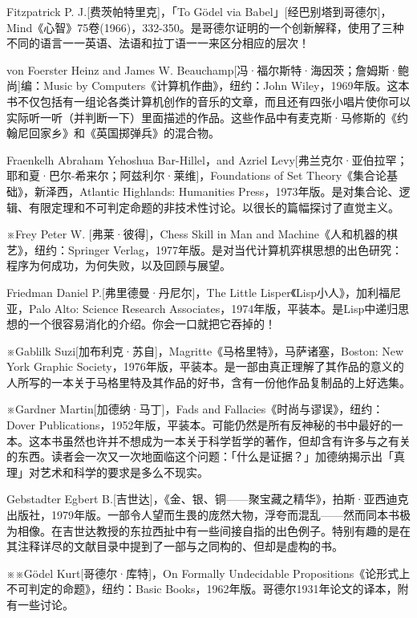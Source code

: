 \documentclass[
  12pt,
  twoside,
  openright,
  oldfontcommands,
]{memoir}
\begin{document}
Fitzpatrick P. J.{[}费茨帕特里克{]}，「To Gödel via
Babel」{[}经巴别塔到哥德尔{]}，Mind《心智》75卷(1966)，332-350。是哥德尔证明的一个创新解释，使用了三种不同的语言一一英语、法语和拉丁语一一来区分相应的层次！

von Foerster Heinz and James W.
Beauchamp{[}冯·福尔斯特·海因茨；詹姆斯·鲍尚{]}编：Music by
Computers《计算机作曲》，纽约：John
Wiley，1969年版。这本书不仅包括有一组论各类计算机创作的音乐的文章，而且还有四张小唱片使你可以实际听一听（并判断一下）里面描述的作品。这些作品中有麦克斯·马修斯的《约翰尼回家乡》和《英国掷弹兵》的混合物。

Fraenkelh Abraham Yehoshua Bar-Hillel，and Azriel
Levy{[}弗兰克尔·亚伯拉罕；耶和夏·巴尔-希来尔；阿兹利尔·莱维{]}，Foundations
of Set Theory《集合论基础》，新泽西，Atlantic Highlands: Humanities
Press，1973年版。是对集合论、逻辑、有限定理和不可判定命题的非技术性讨论。以很长的篇幅探讨了直觉主义。

※Frey Peter W. {[}弗莱·彼得{]}，Chess Skill in Man and
Machine《人和机器的棋艺》，纽约：Springer
Verlag，1977年版。是对当代计算机弈棋思想的出色研究：程序为何成功，为何失败，以及回顾与展望。

Friedman Daniel P.{[}弗里德曼·丹尼尔{]}，The Little
Lisper《Lisp小人》，加利福尼亚，Palo Alto: Science Research
Associates，1974年版，平装本。是Lisp中递归思想的一个很容易消化的介绍。你会一口就把它吞掉的！

※Gablilk
Suzi{[}加布利克·苏自{]}，Magritte《马格里特》，马萨诸塞，Boston: New
York Graphic
Society，1976年版，平装本。是一部由真正理解了其作品的意义的人所写的一本关于马格里特及其作品的好书，含有一份他作品复制品的上好选集。

※Gardner Martin{[}加德纳·马丁{]}，Fads and
Fallacies《时尚与谬误》，纽约：Dover
Publications，1952年版，平装本。可能仍然是所有反神秘的书中最好的一本。这本书虽然也许并不想成为一本关于科学哲学的著作，但却含有许多与之有关的东西。读者会一次又一次地面临这个问题：「什么是证据？」加德纳揭示出「真理」对艺术和科学的要求是多么不现实。

Gebstadter Egbert
B.{[}吉世达{]}，《金、银、铜------聚宝藏之精华》，拍斯·亚西迪克出版社，1979年版。一部令人望而生畏的庞然大物，浮夸而混乱------然而同本书极为相像。在吉世达教授的东拉西扯中有一些间接自指的出色例子。特别有趣的是在其注释详尽的文献目录中提到了一部与之同构的、但却是虚构的书。

※※Gödel Kurt{[}哥德尔·库特{]}，On Formally Undecidable
Propositions《论形式上不可判定的命题》，纽约：Basic
Books，1962年版。哥德尔1931年论文的译本，附有一些讨论。
\end{document}
